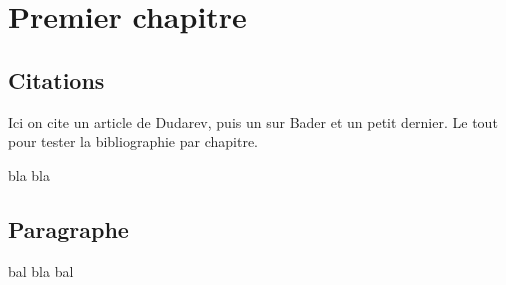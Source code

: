 \chapter{Premier chapitre}

\minitoc

\section{Citations}

Ici on cite un article de Dudarev\cite{Dudarev1998}, puis un sur Bader\cite{Henkelman2006}
et un petit dernier\cite{Blochl1994}. Le tout pour tester la bibliographie par chapitre.

bla bla%

\section{Paragraphe}

bal bla bal%

